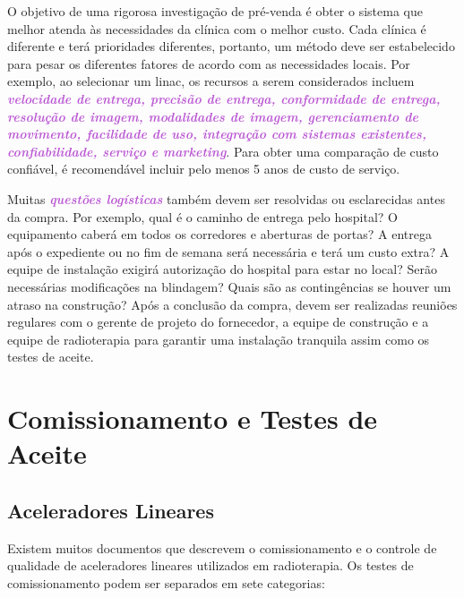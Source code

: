 \documentclass[11pt,a4paper]{article}
\newcounter{exemplo}
\begin{document}
	O objetivo de uma rigorosa investigação de pré-venda é obter o sistema que melhor atenda às necessidades da clínica com o melhor custo. Cada clínica é diferente e terá prioridades diferentes, portanto, um método deve ser estabelecido para pesar os diferentes fatores de acordo com as necessidades locais. Por exemplo, ao selecionar um linac, os recursos a serem considerados incluem \textcolor{MediumOrchid}{\textbf{\textit{velocidade de entrega, precisão de entrega, conformidade de entrega, resolução de imagem, modalidades de imagem, gerenciamento de movimento, facilidade de uso, integração com sistemas existentes, confiabilidade, serviço e marketing}}}. Para obter uma comparação de custo confiável, é recomendável incluir pelo menos 5 anos de custo de serviço.

	Muitas \textcolor{MediumOrchid}{\textbf{\textit{questões logísticas}}} também devem ser resolvidas ou esclarecidas antes da compra. Por exemplo, qual é o caminho de entrega pelo hospital? O equipamento caberá em todos os corredores e aberturas de portas? A entrega após o expediente ou no fim de semana será necessária e terá um custo extra? A equipe de instalação exigirá autorização do hospital para estar no local? Serão necessárias modificações na blindagem? Quais são as contingências se houver um atraso na construção? Após a conclusão da compra, devem ser realizadas reuniões regulares com o gerente de projeto do fornecedor, a equipe de construção e a equipe de radioterapia para garantir uma instalação tranquila assim como os testes de aceite.

\section{Comissionamento e Testes de Aceite}

\subsection*{Aceleradores Lineares}

	Existem muitos documentos que descrevem o comissionamento e o controle de qualidade de aceleradores lineares utilizados em radioterapia. Os testes de comissionamento podem ser separados em sete categorias:
\end{document}
